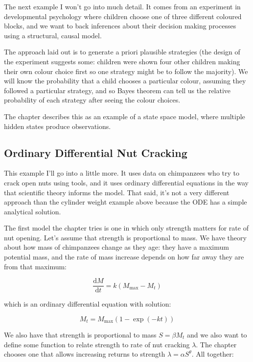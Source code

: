 \documentclass[
]{book}
\begin{document}
The next example I won't go into much detail. It comes from an experiment in developmental psychology where children choose one of three different coloured blocks, and we want to back inferences about their decision making processes using a structural, causal model.

The approach laid out is to generate a priori plausible strategies (the design of the experiment suggests some: children were shown four other children making their own colour choice first so one strategy might be to follow the majority). We will know the probability that a child chooses a particular colour, assuming they followed a particular strategy, and so Bayes theorem can tell us the relative probability of each strategy after seeing the colour choices.

The chapter describes this as an example of a state space model, where multiple hidden states produce observations.

\hypertarget{ordinary-differential-nut-cracking}{%
\subsection*{Ordinary Differential Nut Cracking}\label{ordinary-differential-nut-cracking}}

This example I'll go into a little more. It uses data on chimpanzees who try to crack open nuts using tools, and it uses ordinary differential equations in the way that scientific theory informs the model. That said, it's not a very different approach than the cylinder weight example above because the ODE has a simple analytical solution.

The first model the chapter tries is one in which only strength matters for rate of nut opening. Let's assume that strength is proportional to mass. We have theory about how mass of chimpanzees change as they age: they have a maximum potential mass, and the rate of mass increase depends on how far away they are from that maximum:

\[
\frac{\text{d}M}{\text{d}t} = k (M_\text{max} - M_t)
\]

which is an ordinary differential equation with solution:

\[
M_t = M_\text{max}(1- \exp(-kt))
\]

We also have that strength is proportional to mass \(S = \beta M_t\) and we also want to define some function to relate strength to rate of nut cracking \(\lambda\). The chapter chooses one that allows increasing returns to strength \(\lambda = \alpha S^\theta\). All together:
\end{document}
